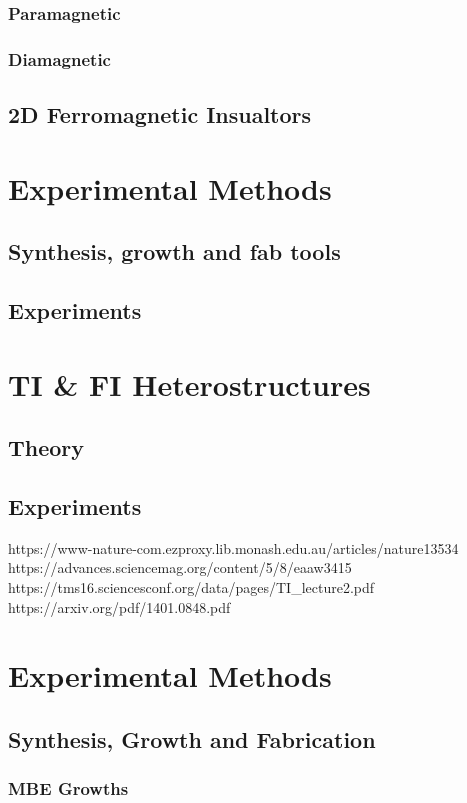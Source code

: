 \documentclass{article} %
\begin{document}
\subsubsection{Paramagnetic}
\subsubsection{Diamagnetic}
\subsection{2D Ferromagnetic Insualtors}
\section{Experimental Methods}
\subsection{Synthesis, growth and fab tools}
\subsection{Experiments}
\section{TI \& FI Heterostructures}
\subsection{Theory}
\subsection{Experiments}

https://www-nature-com.ezproxy.lib.monash.edu.au/articles/nature13534
https://advances.sciencemag.org/content/5/8/eaaw3415
https://tms16.sciencesconf.org/data/pages/TI\_lecture2.pdf
https://arxiv.org/pdf/1401.0848.pdf


\section{Experimental Methods}

\subsection{Synthesis, Growth and Fabrication}
\subsubsection{MBE Growths}
\end{document}
